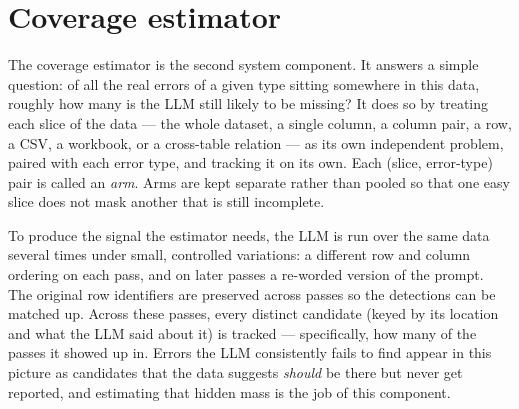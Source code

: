 \documentclass[11pt]{article}
\begin{document}
\section*{Coverage estimator}
The coverage estimator is the second system component. It
answers a simple question: of all the real errors of a given
type sitting somewhere in this data, roughly how many is the
LLM still likely to be missing? It does so by treating each
slice of the data --- the whole dataset, a single column,
a column pair, a row, a CSV, a workbook, or a cross-table
relation --- as its own independent problem, paired with each
error type, and tracking it on its own. Each (slice,
error-type) pair is called an \emph{arm}. Arms are kept
separate rather than pooled so that one easy slice does not
mask another that is still incomplete.

To produce the signal the estimator needs, the LLM is run
over the same data several times under small, controlled
variations: a different row and column ordering on each pass,
and on later passes a re-worded version of the prompt. The
original row identifiers are preserved across passes so the
detections can be matched up. Across these passes, every
distinct candidate (keyed by its location and what the LLM
said about it) is tracked --- specifically, how many of the
passes it showed up in. Errors the LLM consistently fails
to find appear in this picture as candidates that the data
suggests \emph{should} be there but never get reported, and
estimating that hidden mass is the job of this component.
\end{document}
